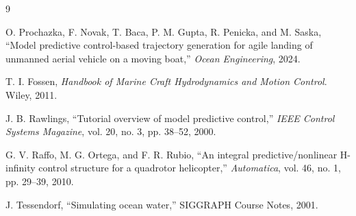 \documentclass[12pt,a4paper]{article}
\begin{document}
\begin{thebibliography}{9}

O. Prochazka, F. Novak, T. Baca, P. M. Gupta, R. Penicka, and M. Saska,
``Model predictive control-based trajectory generation for agile landing of unmanned aerial vehicle on a moving boat,''
\emph{Ocean Engineering}, 2024.

T. I. Fossen,
\emph{Handbook of Marine Craft Hydrodynamics and Motion Control}.
Wiley, 2011.

J. B. Rawlings,
``Tutorial overview of model predictive control,''
\emph{IEEE Control Systems Magazine}, vol. 20, no. 3, pp. 38--52, 2000.

G. V. Raffo, M. G. Ortega, and F. R. Rubio,
``An integral predictive/nonlinear H-infinity control structure for a quadrotor helicopter,''
\emph{Automatica}, vol. 46, no. 1, pp. 29--39, 2010.

J. Tessendorf,
``Simulating ocean water,''
SIGGRAPH Course Notes, 2001.

\end{thebibliography}
\end{document}
